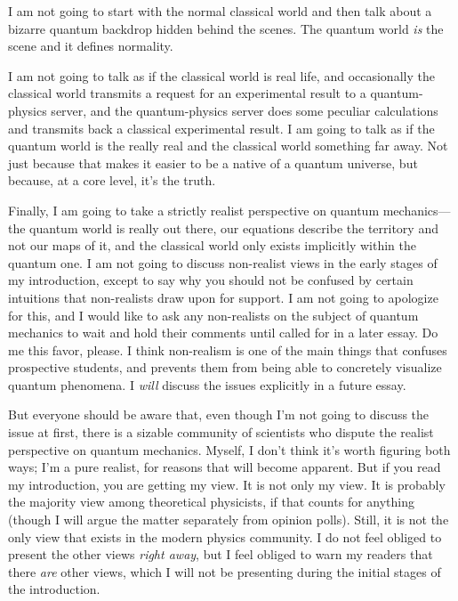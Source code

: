 {
 I am not going to start with the normal classical world and then
talk about a bizarre quantum backdrop hidden behind the scenes. The
quantum world \textit{is} the scene and it defines normality.}

{
 I am not going to talk as if the classical world is real life, and
occasionally the classical world transmits a request for an
experimental result to a quantum-physics server, and the
quantum-physics server does some peculiar calculations and transmits
back a classical experimental result. I am going to talk as if the
quantum world is the really real and the classical world something far
away. Not just because that makes it easier to be a native of a quantum
universe, but because, at a core level, it's the
truth.}

{
 Finally, I am going to take a strictly realist perspective on
quantum mechanics---the quantum world is really out there, our
equations describe the territory and not our maps of it, and the
classical world only exists implicitly within the quantum one. I am not
going to discuss non-realist views in the early stages of my
introduction, except to say why you should not be confused by certain
intuitions that non-realists draw upon for support. I am not going to
apologize for this, and I would like to ask any non-realists on the
subject of quantum mechanics to wait and hold their comments until
called for in a later essay. Do me this favor, please. I think
non-realism is one of the main things that confuses prospective
students, and prevents them from being able to concretely visualize
quantum phenomena. I \textit{will} discuss the issues explicitly in a
future essay.}

{
 But everyone should be aware that, even though I'm
not going to discuss the issue at first, there is a sizable community
of scientists who dispute the realist perspective on quantum mechanics.
Myself, I don't think it's worth
figuring both ways; I'm a pure realist, for reasons
that will become apparent. But if you read my introduction, you are
getting my view. It is not only my view. It is probably the majority
view among theoretical physicists, if that counts for anything (though
I will argue the matter separately from opinion polls). Still, it is
not the only view that exists in the modern physics community. I do not
feel obliged to present the other views \textit{right away}, but I feel
obliged to warn my readers that there \textit{are} other views, which I
will not be presenting during the initial stages of the introduction.}

